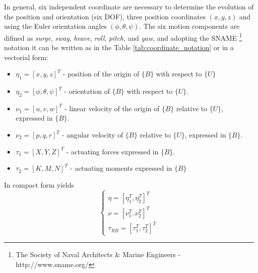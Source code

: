 \par In general, six independent coordinate are necessary to determine the evolution of the position and orientation (six \ac{DOF}), three position coordinates $(x,y,z)$ and using the Euler orientation angles $(\phi, \theta, \psi)$. The six motion components are difined as \textit{surge}, \textit{sway}, \textit{heave}, \textit{roll}, \textit{pitch}, and \textit{yaw}, and adopting the SNAME \footnote{The Society of Naval Architects \& Marine Engineers - http://www.sname.org/} notation it can be written as in the Table \ref{tab:coordinate_notation} or in a vectorial form: 
\begin{itemize}
    \item $\eta_1 = [x,y,z]^T$ - position of the origin of $\{B\}$ with respect to $\{U\}$
    \item $\eta_2 = [\phi, \theta, \psi]^T$ - orientation of $\{B\}$ with respect to $\{U\}$.
    \item $\nu_1 = [u,v,w]^T$ - linear velocity of the origin of $\{B\}$ relative to $\{U\}$, expressed in $\{B\}$.
    \item $\nu_2 = [p,q,r]^T$ - angular velocity of $\{B\}$ relative to $\{U\}$, expressed in $\{B\}$.
    \item $\tau_1 = [X,Y,Z]^T$ - actuating forces expressed in $\{B\}$.
    \item $\tau_2 = [K,M,N]^T$ - actuating moments expressed in $\{B\}$
\end{itemize}
In compact form yields
\begin{equation}
    \begin{cases}
        \eta = [\eta_1^T, \eta_2^T]^T \\
        \nu = [\nu_1^T, \nu_2^T]^T \\
        \tau_{RB} = [\tau_1^T, \tau_2^T]^T
    \end{cases}
\end{equation}

